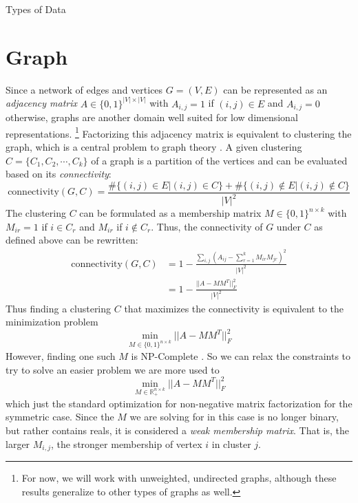\documentclass[12pt]{pom_thesis}
\begin{document}
\begin{chapter}{Types of Data}
\section{Graph}
Since a network of edges and vertices $G=(V,E)$ can be represented as an \textit{adjacency matrix} $A \in \{0,1\}^{|V| \times |V|}$ with $A_{i,j} = 1$ if $(i,j) \in E$ and $A_{i,j}=0$ otherwise, graphs are another domain well suited for low dimensional representations. \footnote{For now, we will work with unweighted, undirected graphs, although these results generalize to other types of graphs as well.} Factorizing this adjacency matrix is equivalent to clustering the graph, which is a central problem to graph theory \cite{ho2008nonnegative}.
A given clustering $C = \{C_1, C_2, \cdots, C_k\}$ of a graph is a partition of the vertices and can be evaluated based on its \textit{connectivity}:
$$\text{connectivity}(G,C) = \frac{\#\{(i,j)\in E | (i,j) \in C\} + \#\{(i,j)\not\in E | (i,j) \not\in C\}}{|V|^2}$$
The clustering $C$ can be formulated as a membership matrix $M \in \{0,1\}^{n \times k}$ with $M_{ir}=1$ if $i \in C_r$ and $M_{ir}$ if $i \not\in C_r$. Thus, the connectivity of $G$ under $C$ as defined above can be rewritten:
\begin{align*}\text{connectivity}(G,C)  &= 1-\frac{\sum_{i,j} \left(A_{ij} - \sum_{r=1}^k M_{ir}M_{jr}\right)^2}{|V|^2}\\
&=1-\frac{||A-MM^T||^2_F}{|V|^2}
\end{align*}
Thus finding a clustering $C$ that maximizes the connectivity is equivalent to the minimization problem 
$$\min_{M \in \{0,1\}^{n\times k}} ||A-MM^T||^2_F$$
However, finding one such $M$ is NP-Complete \cite{vavasis2009complexity}. So we can relax the constraints to try to solve an easier problem we are more used to 
$$\min_{M \in \mathbb{R}_{+}^{n\times k}} ||A-MM^T||^2_F$$
which just the standard optimization for non-negative matrix factorization for the symmetric case. Since the $M$ we are solving for in this case is no longer binary, but rather contains reals, it is considered a \textit{weak membership matrix}. That is, the larger $M_{i,j}$, the stronger membership of vertex $i$ in cluster $j$. 

\end{chapter}
\end{document}
